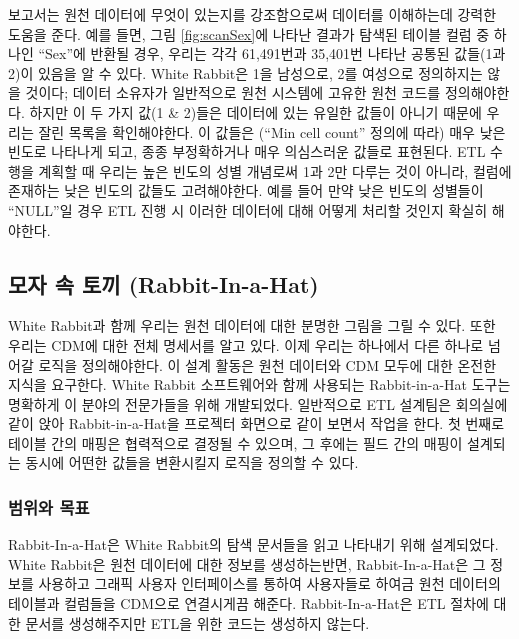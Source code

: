 \documentclass[11pt]{book}
\theoremstyle{definition}
\theoremstyle{definition}
\theoremstyle{definition}
\theoremstyle{remark}
\begin{document}
보고서는 원천 데이터에 무엇이 있는지를 강조함으로써 데이터를 이해하는데
강력한 도움을 준다. 예를 들면, 그림 \ref{fig:scanSex}에 나타난 결과가
탐색된 테이블 컬럼 중 하나인 ``Sex''에 반환될 경우, 우리는 각각
61,491번과 35,401번 나타난 공통된 값들(1과 2)이 있음을 알 수 있다. White
Rabbit은 1을 남성으로, 2를 여성으로 정의하지는 않을 것이다; 데이터
소유자가 일반적으로 원천 시스템에 고유한 원천 코드를 정의해야한다.
하지만 이 두 가지 값(1 \& 2)들은 데이터에 있는 유일한 값들이 아니기
때문에 우리는 잘린 목록을 확인해야한다. 이 값들은 (``Min cell count''
정의에 따라) 매우 낮은 빈도로 나타나게 되고, 종종 부정확하거나 매우
의심스러운 값들로 표현된다. ETL 수행을 계획할 때 우리는 높은 빈도의 성별
개념로써 1과 2만 다루는 것이 아니라, 컬럼에 존재하는 낮은 빈도의 값들도
고려해야한다. 예를 들어 만약 낮은 빈도의 성별들이 ``NULL''일 경우 ETL
진행 시 이러한 데이터에 대해 어떻게 처리할 것인지 확실히 해야한다.

\subsection{모자 속 토끼 (Rabbit-In-a-Hat)}\label{---rabbit-in-a-hat}

White Rabbit과 함께 우리는 원천 데이터에 대한 분명한 그림을 그릴 수
있다. 또한 우리는 CDM에 대한 전체 명세서를 알고 있다. 이제 우리는
하나에서 다른 하나로 넘어갈 로직을 정의해야한다. 이 설계 활동은 원천
데이터와 CDM 모두에 대한 온전한 지식을 요구한다. White Rabbit
소프트웨어와 함께 사용되는 Rabbit-in-a-Hat 도구는 명확하게 이 분야의
전문가들을 위해 개발되었다. 일반적으로 ETL 설계팀은 회의실에 같이 앉아
Rabbit-in-a-Hat을 프로젝터 화면으로 같이 보면서 작업을 한다. 첫 번째로
테이블 간의 매핑은 협력적으로 결정될 수 있으며, 그 후에는 필드 간의
매핑이 설계되는 동시에 어떤한 값들을 변환시킬지 로직을 정의할 수 있다.
 

\subsubsection*{범위와 목표}\label{--1}

Rabbit-In-a-Hat은 White Rabbit의 탐색 문서들을 읽고 나타내기 위해
설계되었다. White Rabbit은 원천 데이터에 대한 정보를 생성하는반면,
Rabbit-In-a-Hat은 그 정보를 사용하고 그래픽 사용자 인터페이스를 통하여
사용자들로 하여금 원천 데이터의 테이블과 컬럼들을 CDM으로 연결시게끔
해준다. Rabbit-In-a-Hat은 ETL 절차에 대한 문서를 생성해주지만 ETL을 위한
코드는 생성하지 않는다.
\end{document}
